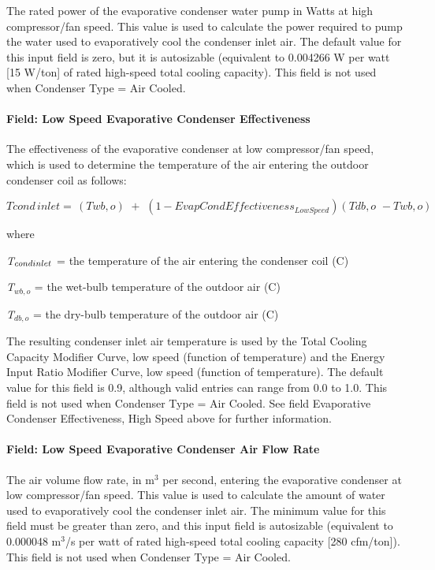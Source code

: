 The rated power of the evaporative condenser water pump in Watts at high compressor/fan speed. This value is used to calculate the power required to pump the water used to evaporatively cool the condenser inlet air. The default value for this input field is zero, but it is autosizable (equivalent to 0.004266 W per watt {[}15 W/ton{]} of rated high-speed total cooling capacity). This field is not used when Condenser Type = Air Cooled.

\paragraph{Field: Low Speed Evaporative Condenser Effectiveness}\label{field-low-speed-evaporative-condenser-effectiveness}

The effectiveness of the evaporative condenser at low compressor/fan speed, which is used to determine the temperature of the air entering the outdoor condenser coil as follows:

\begin{equation}
Tcond\,inlet = \,\left( {Twb,o} \right)\,\, + \,\,\left( {1 - EvapCondEffectivenes{s_{LowSpeed}}} \right)\left( {Tdb,o\,\, - Twb,o} \right)
\end{equation}

where

\emph{T\(_{cond\\ inlet}\)} = the temperature of the air entering the condenser coil (C)

\emph{T\(_{wb,o}\)} = the wet-bulb temperature of the outdoor air (C)

\emph{T\(_{db,o}\)} = the dry-bulb temperature of the outdoor air (C)

The resulting condenser inlet air temperature is used by the Total Cooling Capacity Modifier Curve, low speed (function of temperature) and the Energy Input Ratio Modifier Curve, low speed (function of temperature). The default value for this field is 0.9, although valid entries can range from 0.0 to 1.0. This field is not used when Condenser Type = Air Cooled. See field Evaporative Condenser Effectiveness, High Speed above for further information.

\paragraph{Field: Low Speed Evaporative Condenser Air Flow Rate}\label{field-low-speed-evaporative-condenser-air-flow-rate}

The air volume flow rate, in m\(^{3}\) per second, entering the evaporative condenser at low compressor/fan speed. This value is used to calculate the amount of water used to evaporatively cool the condenser inlet air. The minimum value for this field must be greater than zero, and this input field is autosizable (equivalent to 0.000048 m\(^{3}\)/s per watt of rated high-speed total cooling capacity {[}280 cfm/ton{]}). This field is not used when Condenser Type = Air Cooled.

